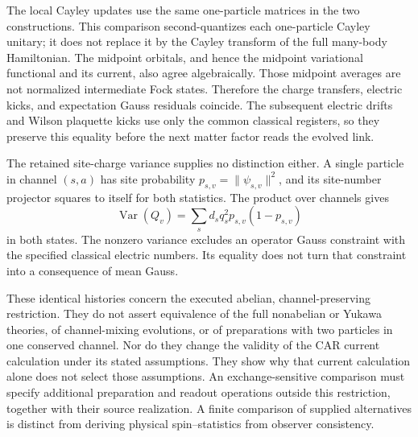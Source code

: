 The local Cayley updates use the same one-particle matrices in the two
constructions. This comparison second-quantizes each one-particle Cayley
unitary; it does not replace it by the Cayley transform of the full
many-body Hamiltonian. The midpoint orbitals, and hence the midpoint
variational functional and its current, also agree algebraically. Those
midpoint averages are not normalized intermediate Fock states. Therefore
the charge transfers, electric kicks, and expectation Gauss residuals
coincide. The subsequent electric drifts and Wilson plaquette kicks use
only the common classical registers, so they preserve this equality
before the next matter factor reads the evolved link.

The retained site-charge variance supplies no distinction either. A
single particle in channel $(s,a)$ has site probability
$p_{s,v}=\|\psi_{s,v}\|^2$, and its site-number projector squares to
itself for both statistics. The product over channels gives
\[
 \operatorname{Var}(Q_v)
   =\sum_s d_s q_s^2p_{s,v}(1-p_{s,v})
\]
in both states. The nonzero variance excludes an operator Gauss
constraint with the specified classical electric numbers. Its equality
does not turn that constraint into a consequence of mean Gauss.

These identical histories concern the executed abelian, channel-preserving
restriction. They do not assert equivalence of the full nonabelian or
Yukawa theories, of channel-mixing evolutions, or of preparations with two
particles in one conserved channel. Nor do they change the validity of
the CAR current calculation under its stated assumptions. They show why
that current calculation alone does not select those assumptions. An
exchange-sensitive comparison must specify additional preparation and
readout operations outside this restriction, together with their source
realization. A finite comparison of supplied alternatives is distinct
from deriving physical spin--statistics from observer consistency.

